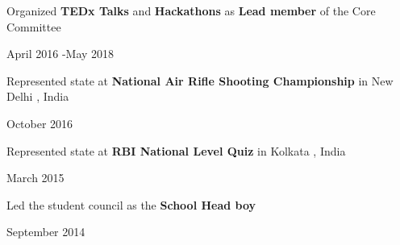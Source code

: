 \documentclass[]{Keval-resume}
\begin{document}
\begin{flushleft}
\begin{minipage}[t]{.78\textwidth}
	\textbullet{} Organized \textbf{TEDx Talks}  and \textbf{Hackathons}  as \textbf{Lead member} of the {Core Committee}
\end{minipage}%
\begin{minipage}[t]{.22\textwidth}
	\hfill April 2016 -May 2018
\end{minipage}
\begin{minipage}[t]{.78\textwidth}
	\textbullet{} Represented  state at \textbf{National Air Rifle Shooting Championship}{ in New Delhi , India}
\end{minipage}%
\begin{minipage}[t]{.22\textwidth}
	\hfill October 2016 
\end{minipage}

\begin{minipage}[t]{.78\textwidth}
	\textbullet{} Represented  state at \textbf{RBI National Level Quiz}{ in Kolkata , India}
\end{minipage}%
\begin{minipage}[t]{.22\textwidth}
	\hfill March 2015 
\end{minipage}
\begin{minipage}[t]{.78\textwidth}
	\textbullet{} Led the student council as the \textbf{School Head boy}
\end{minipage}%
\begin{minipage}[t]{.22\textwidth}
	\hfill September 2014 
\end{minipage}
\end{flushleft}
\fi
\end{document}

